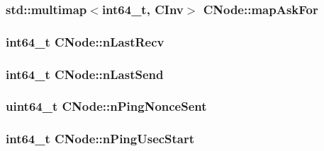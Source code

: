 \subsubsection[{map\+Ask\+For}]{\setlength{\rightskip}{0pt plus 5cm}std\+::multimap$<$int64\+\_\+t, {\bf C\+Inv}$>$ C\+Node\+::map\+Ask\+For}\label{class_c_node_a7593dfbd76c34a81169e3fb2aa0e0cf7}
\hypertarget{class_c_node_afb40f43a51ba686de93256727351af07}{}
\subsubsection[{n\+Last\+Recv}]{\setlength{\rightskip}{0pt plus 5cm}int64\+\_\+t C\+Node\+::n\+Last\+Recv}\label{class_c_node_afb40f43a51ba686de93256727351af07}
\hypertarget{class_c_node_af39253ad525733ca64ab3fc785dfc4eb}{}
\subsubsection[{n\+Last\+Send}]{\setlength{\rightskip}{0pt plus 5cm}int64\+\_\+t C\+Node\+::n\+Last\+Send}\label{class_c_node_af39253ad525733ca64ab3fc785dfc4eb}
\hypertarget{class_c_node_a9a077fbd09ddee1d81f027bc01a4ec68}{}
\subsubsection[{n\+Ping\+Nonce\+Sent}]{\setlength{\rightskip}{0pt plus 5cm}uint64\+\_\+t C\+Node\+::n\+Ping\+Nonce\+Sent}\label{class_c_node_a9a077fbd09ddee1d81f027bc01a4ec68}
\hypertarget{class_c_node_a8352aa332af726ff117fb890c4dd3869}{}
\subsubsection[{n\+Ping\+Usec\+Start}]{\setlength{\rightskip}{0pt plus 5cm}int64\+\_\+t C\+Node\+::n\+Ping\+Usec\+Start}\label{class_c_node_a8352aa332af726ff117fb890c4dd3869}
\hypertarget{class_c_node_ada34ffe1700a5dafb57de7c4d2491844}{}
